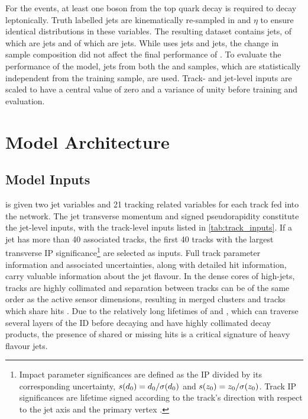 For the \ttbar events, at least one \Wboson boson from the top quark decay is required to decay leptonically.
Truth labelled \bcl jets are kinematically re-sampled in \pt and $\eta$ to ensure identical distributions in these variables. 
The resulting dataset contains \njetstrain jets,  of which are \ttbar jets and  of which are \Zprime jets.
While \DLr uses  \ttbar jets and  \Zprime jets, the change in sample composition did not affect the final performance of \GNN.
To evaluate the performance of the model, \njetsval jets from both the \ttbar and \Zprime samples, which are statistically independent from the training sample, are used. 
Track- and jet-level inputs are scaled to have a central value of zero and a variance of unity before training and evaluation. 


\section{Model Architecture}\label{sec:networks}

\subsection{Model Inputs}\label{sec:model-inputs}

\newcommand{\ipdefsfootnote}{%
Impact parameter significances are defined as the IP divided by its corresponding uncertainty, $\dzerosig = d_0 / \dzerouncert$ and $\zzerosig = z_0 / \zzerouncert$.
Track IP significances are lifetime signed according to the track's direction with respect to the jet axis and the primary vertex \cite{PERF-2012-04}.
}

\GNN is given two jet variables and 21 tracking related variables for each track fed into the network.
The jet transverse momentum and signed pseudorapidity constitute the jet-level inputs, with the track-level inputs listed in \cref{tab:track_inputs}.
If a jet has more than 40 associated tracks, the first 40 tracks with the largest transverse IP significance\footnote{\ipdefsfootnote} \dzerosig are selected as inputs.
Full track parameter information and associated uncertainties, along with detailed hit information, carry valuable information about the jet flavour.
In the dense cores of high-\pt jets, tracks are highly collimated and separation between tracks can be of the same order as the active sensor dimensions, resulting in merged clusters and tracks which share hits \cite{PERF-2015-08}.
Due to the relatively long lifetimes of \bhadrons and \chadrons, which can traverse several layers of the ID before decaying and have highly collimated decay products, the presence of shared or missing hits is a critical signature of heavy flavour jets.

